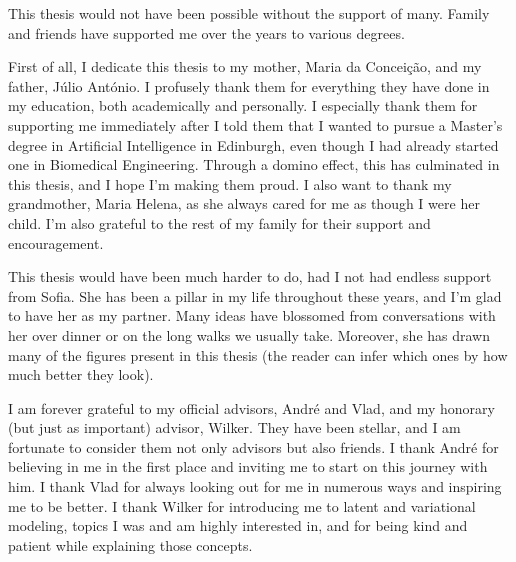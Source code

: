 \begin{acknowledgments}

    This thesis would not have been possible without the support of
    many. Family and friends have supported me over
    the years to various degrees.
    
    First of all, I dedicate this thesis to my mother, Maria da
    Conceição, and my father, Júlio António. I profusely thank them
    for everything they have done in my education, both academically
    and personally. I especially thank them for supporting me
    immediately after I told them that I wanted to pursue a Master's
    degree in Artificial Intelligence in Edinburgh, even though I had
    already started one in Biomedical Engineering. Through a domino
    effect, this has culminated in this thesis, and I hope I'm making
    them proud. I also want to thank my grandmother, Maria Helena, as she
    always cared for me as though I were her child. I'm also grateful
    to the rest of my family for their support and encouragement.
    
    This thesis would have been much harder to do, had I not had
    endless support from Sofia. She has been a pillar in my life
    throughout these years, and I'm glad to have her as my partner.
    Many ideas have blossomed from conversations with her over dinner
    or on the long walks we usually take. Moreover, she has drawn
    many of the figures present in this thesis (the reader can infer
    which ones by how much better they look).
    
    I am forever grateful to my official advisors, André and Vlad,
    and my honorary (but just as important) advisor, Wilker. They
    have been stellar, and I am fortunate to consider them not only
    advisors but also friends. I thank André for believing in me in
    the first place and inviting me to start on this journey with
    him. I thank Vlad for always looking out for me in numerous ways
    and inspiring me to be better. I thank Wilker for introducing me
    to latent and variational modeling, topics I was and am highly
    interested in, and for being kind and patient while explaining
    those concepts.
    

\end{acknowledgments}
